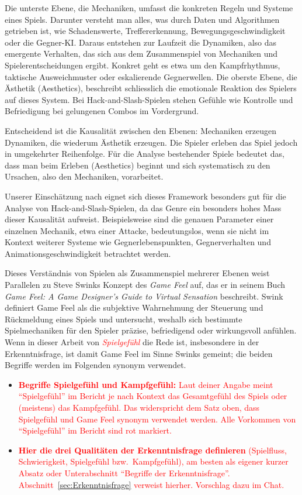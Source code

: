 \documentclass[../Main.tex]{subfiles}
\begin{document}
Die unterste Ebene, die Mechaniken, umfasst die konkreten Regeln und Systeme eines Spiels. Darunter versteht man alles, was durch Daten und Algorithmen getrieben ist, wie Schadenswerte, Treffererkennung, Bewegungsgeschwindigkeit oder die Gegner-KI. Daraus entstehen zur Laufzeit die Dynamiken, also das emergente Verhalten, das sich aus dem Zusammenspiel von Mechaniken und Spielerentscheidungen ergibt. Konkret geht es etwa um den Kampfrhythmus, taktische Ausweichmuster oder eskalierende Gegnerwellen. Die oberste Ebene, die Ästhetik (Aesthetics), beschreibt schliesslich die emotionale Reaktion des Spielers auf dieses System. Bei Hack-and-Slash-Spielen stehen Gefühle wie Kontrolle und Befriedigung bei gelungenen Combos im Vordergrund.

Entscheidend ist die Kausalität zwischen den Ebenen: Mechaniken erzeugen Dynamiken, die wiederum Ästhetik erzeugen. Die Spieler erleben das Spiel jedoch in umgekehrter Reihenfolge.\autocite[\textcolor{red}{S.~??}]{hunicke2004mda} Für die Analyse bestehender Spiele bedeutet das, dass man beim Erleben (Aesthetics) beginnt und sich systematisch zu den Ursachen, also den Mechaniken, vorarbeitet.

Unserer Einschätzung nach eignet sich dieses Framework besonders gut für die Analyse von Hack-and-Slash-Spielen, da das Genre ein besonders hohes Mass dieser Kausalität aufweist. Beispielsweise sind die genauen Parameter einer einzelnen Mechanik, etwa einer Attacke, bedeutungslos, wenn sie nicht im Kontext weiterer Systeme wie Gegnerlebenspunkten, Gegnerverhalten und Animationsgeschwindigkeit betrachtet werden.

Dieses Verständnis von Spielen als Zusammenspiel mehrerer Ebenen weist Parallelen zu Steve Swinks Konzept des \textit{Game Feel} auf, das er in seinem Buch \textit{Game Feel: A Game Designer’s Guide to Virtual Sensation} beschreibt. Swink definiert Game Feel als die subjektive Wahrnehmung der Steuerung und Rückmeldung eines Spiels und untersucht, weshalb sich bestimmte Spielmechaniken für den Spieler präzise, befriedigend oder wirkungsvoll anfühlen.\autocite[1--6]{swink2008gamefeel} Wenn in dieser Arbeit von \textit{\textcolor{red}{Spielgefühl}} die Rede ist, insbesondere in der Erkenntnisfrage, ist damit Game Feel im Sinne Swinks gemeint; die beiden Begriffe werden im Folgenden synonym verwendet.

\begin{itemize}[leftmargin=1.5cm]
    \item \textcolor{red}{\textbf{Begriffe Spielgefühl und Kampfgefühl:} Laut deiner Angabe meint \enquote{Spielgefühl} im Bericht je nach Kontext das Gesamtgefühl des Spiels oder (meistens) das Kampfgefühl. Das widerspricht dem Satz oben, dass Spielgefühl und Game Feel synonym verwendet werden. Alle Vorkommen von \enquote{Spielgefühl} im Bericht sind rot markiert.}
    \item \textcolor{red}{\textbf{Hier die drei Qualitäten der Erkenntnisfrage definieren} (Spielfluss, Schwierigkeit, Spielgefühl bzw.\ Kampfgefühl), am besten als eigener kurzer Absatz oder Unterabschnitt \enquote{Begriffe der Erkenntnisfrage}. Abschnitt~\ref{sec:Erkenntnisfrage} verweist hierher. Vorschlag dazu im Chat.}
\end{itemize}
\end{document}
